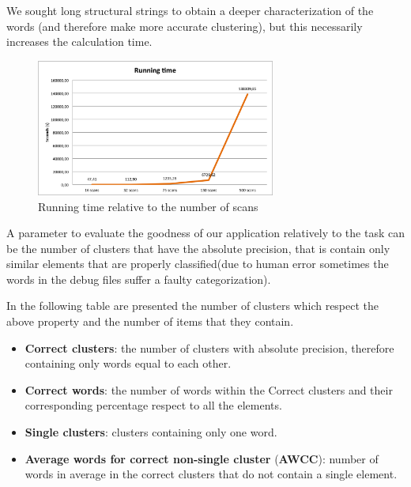 We sought long structural strings to obtain a deeper characterization of the words (and therefore make more accurate clustering), but this necessarily increases the calculation time.

\begin{figure}[!htbp]
\centering
\includegraphics[width=0.7\textwidth]{images/esecuzione}
\caption{Running time relative to the number of scans}
\label{fig:time}
\end{figure}

A parameter to evaluate the goodness of our application relatively to the task can be the number of clusters that have the absolute precision, that is contain only similar elements that are properly classified(due to human error sometimes the words in the debug files suffer a faulty categorization).

In the following table are presented the number of clusters which respect the above property and the number of items that they contain. 

\begin{itemize}

\item \textbf{Correct clusters}: the number of clusters with absolute precision, therefore containing only words equal to each other.
\item \textbf{Correct words}: the number of words within the Correct clusters and their corresponding percentage respect to all the elements.
\item \textbf{Single clusters}: clusters containing only one word.
\item \textbf{Average words for correct non-single cluster} (\textbf{AWCC}): number of words in average in the correct clusters that do not contain a single element.
\end{itemize}

